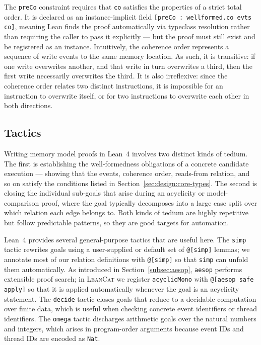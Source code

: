 The \texttt{preCo} constraint requires that \texttt{co} satisfies the properties of a strict total order. It is declared as an instance-implicit field \texttt{[preCo : wellformed.co evts co]}, meaning Lean finds the proof automatically via typeclass resolution rather than requiring the caller to pass it explicitly — but the proof must still exist and be registered as an instance. Intuitively, the coherence order represents a sequence of write events to the same memory location. As such, it is transitive: if one write overwrites another, and that write in turn overwrites a third, then the first write necessarily overwrites the third. It is also irreflexive: since the coherence order relates two distinct instructions, it is impossible for an instruction to overwrite itself, or for two instructions to overwrite each other in both directions.



\subsection{Tactics}

Writing memory model proofs in Lean~4 involves two distinct kinds of tedium. The first is establishing the well-formedness obligations of a concrete candidate execution --- showing that the events, coherence order, reads-from relation, and so on satisfy the conditions listed in Section~\ref{sec:design:core-types}. The second is closing the individual sub-goals that arise during an acyclicity or model-comparison proof, where the goal typically decomposes into a large case split over which relation each edge belongs to. Both kinds of tedium are highly repetitive but follow predictable patterns, so they are good targets for automation.

Lean~4 provides several general-purpose tactics that are useful here. The \texttt{simp} tactic rewrites goals using a user-supplied or default set of \texttt{@[simp]} lemmas; we annotate most of our relation definitions with \texttt{@[simp]} so that \texttt{simp} can unfold them automatically. As introduced in Section~\ref{subsec:aesop}, \texttt{aesop} performs extensible proof search; in \textsc{LeanCat} we register \texttt{acyclicMono} with \texttt{@[aesop safe apply]} so that it is applied automatically whenever the goal is an acyclicity statement. The \texttt{decide} tactic closes goals that reduce to a decidable computation over finite data, which is useful when checking concrete event identifiers or thread identifiers. The \texttt{omega} tactic discharges arithmetic goals over the natural numbers and integers, which arises in program-order arguments because event IDs and thread IDs are encoded as \texttt{Nat}.

